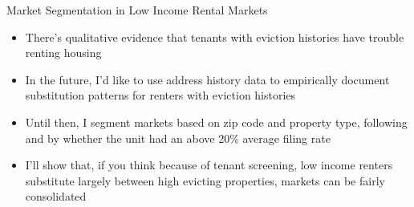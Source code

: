 \documentclass[10pt, xcolor=dvipsnames]{beamer}
\begin{document}
    

\begin{frame}{Market Segmentation in Low Income Rental Markets}
    \begin{itemize}
        \item There's qualitative evidence that tenants with eviction histories have trouble renting housing \parencite{desmond-evicted}
        \pause
        \item In the future, I'd like to use address history data to empirically document substitution patterns for renters with eviction histories
        \pause
        \item Until then, I segment markets based on zip code and property type, following \parencite{framoutar2024market, calderwang2024algorithmic} and by whether the unit had an above 20\% average filing rate
        \pause
        \item I'll show that, if you think because of tenant screening, low income renters substitute largely between high evicting properties, markets can be fairly consolidated
    \end{itemize}
\end{frame}
\end{document}
